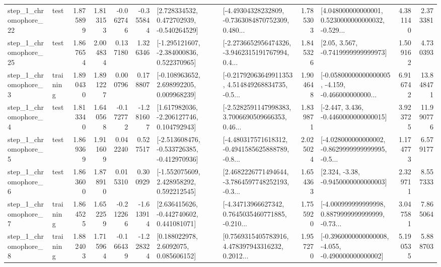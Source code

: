 \begin{tabular}{llrrrrllrlrr}
    step\_1\_chromophore\_22 &      test &      1.875899 &    1.813153 &     -0.062746 & -0.355844 &    [2.728334532, 0.472702939, -0.540264529] &  [-4.49304328232809, -0.7363084870752309, 0.480... &       1.785303 &  [4.048000000000001, 0.5230000000000032, -0.529... &            4.381140 &          2.373381 \\
    step\_1\_chromophore\_25 &      test &      1.867654 &    2.004834 &      0.137180 &  1.326346 &   [-1.295121607, -2.384000836, 0.522370965] &  [-2.2736652956474326, -3.9462315191767994, 0.4... &       1.845326 &                 [2.05, 3.567, -0.7419999999999973] &            1.509162 &          4.730393 \\
     step\_1\_chromophore\_3 &  training &      1.890430 &    1.891227 &      0.000796 &  0.178807 &    [-0.108963652, 2.698992205, 0.009968239] &  [-0.21792063649911353, 4.514849268834735, -0.5... &       1.904648 &  [-0.05800000000000005, -4.159, -0.466000000000... &            6.916742 &         13.848471 \\
     step\_1\_chromophore\_4 &      test &      1.813340 &    1.640568 &     -0.172772 & -1.281607 &    [1.617982036, -2.206127746, 0.104792943] &  [-2.5282591147998383, 3.7006690509666353, 0.46... &       1.839871 &               [-2.447, 3.436, -0.4460000000000015] &            3.923725 &         11.990776 \\
     step\_1\_chromophore\_5 &      test &      1.869369 &    1.911609 &      0.042240 &  0.527517 &  [-2.513608476, -0.533726385, -0.412970936] &  [-4.480317571618312, -0.4941585625888789, -0.8... &       2.025024 &  [-4.028000000000002, -0.8629999999999995, -0.5... &            1.174773 &          6.579177 \\
     step\_1\_chromophore\_6 &      test &      1.863600 &    1.878910 &      0.015310 &  0.300929 &    [-1.552075609, 2.428958292, 0.592212545] &  [2.4682226771494644, -3.7864597748252193, -0.3... &       1.654363 &                [2.324, -3.38, -0.9450000000000003] &            2.329711 &          8.557333 \\
     step\_1\_chromophore\_7 &  training &      1.864525 &    1.652259 &     -0.212266 & -1.613914 &    [2.636415626, -0.442740602, 0.441081071] &  [-4.34713966627342, 0.7645035460771885, -0.210... &       1.755920 &  [-4.000999999999998, 0.8879999999999999, -0.73... &            3.047581 &          7.865064 \\
     step\_1\_chromophore\_8 &  training &      1.882403 &    1.715964 &     -0.166439 & -1.228324 &       [0.188022978, 2.6092075, 0.085606152] &  [0.7569315405783916, 4.478397943316232, 0.2012... &       1.957270 &  [-0.3960000000000008, -4.055, -0.490000000000002] &            5.190535 &          5.888703 \\

\end{tabular}
